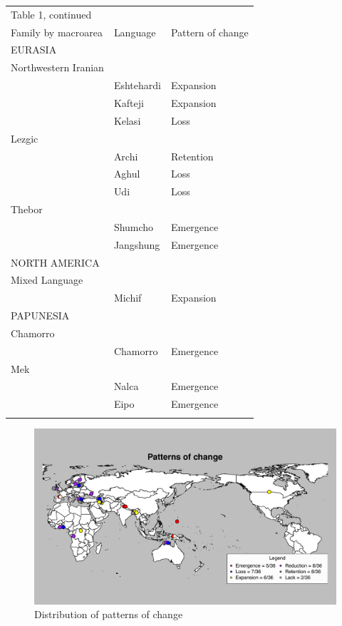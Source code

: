 \documentclass[output=collectionpaper]{langsci/langscibook}
\begin{document}
  \begin{table}[h!]
\small
 \begin{tabular}{lll}  %
Table 1,  continued &&\\
  \lsptoprule
Family by macroarea & Language & Pattern of change\\
  \lsptoprule
EURASIA &&\\
Northwestern Iranian && \\
& Eshtehardi& Expansion\\
&Kafteji& Expansion \\
&Kelasi&Loss \\
\midrule
Lezgic &&\\
&Archi&  Retention \\
&Aghul& Loss\\
& Udi& Loss\\
\midrule
Thebor &&\\
& Shumcho& Emergence\\
& Jangshung&Emergence\\
\midrule
NORTH AMERICA&&\\
\midrule
Mixed Language &&\\
& Michif&Expansion\\
\midrule
PAPUNESIA &&\\
\midrule
Chamorro && \\
&Chamorro& Emergence\\
\midrule
Mek &&\\
&Nalca&Emergence\\
&Eipo&Emergence\\
 \lspbottomrule
 \end{tabular}
 \end{table}

\begin{figure}
\includegraphics[height=.4\textheight]{figures/11/Patterns_sample}
\caption{Distribution of patterns of change}
\label{fig:dgm:patterns}
\end{figure}
\newpage
\end{document}
